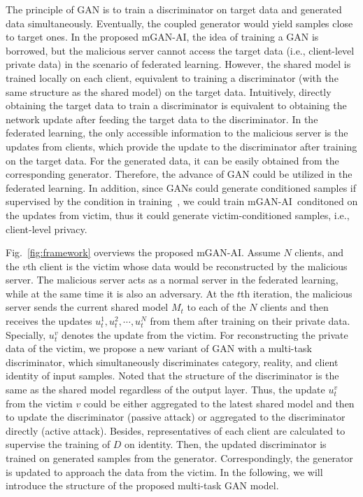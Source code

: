 \documentclass[10pt, conference, letterpaper]{IEEEtran}
\newcommand{\alg}{mGAN-AI}
\begin{document}
The principle of GAN is to train a discriminator on target data and generated data simultaneously. Eventually, the coupled generator would yield samples close to target ones.
In the proposed \alg, the idea of training a GAN is borrowed, but the malicious server cannot access the target data (i.e., client-level private data) in the scenario of federated learning.
However, the shared model is trained locally on each client, equivalent to training a discriminator (with the same structure as the shared model) on the target data. Intuitively, directly obtaining the target data to train a discriminator is equivalent to obtaining the network update after feeding the target data to the discriminator. In the federated learning, the only accessible information to the malicious server is the updates from clients, which provide the update to the discriminator after training on the target data. For the generated data, it can be easily obtained from the corresponding generator. Therefore, the advance of GAN could be utilized in the federated learning. In addition, since GANs could generate conditioned samples if supervised by the condition in training~\cite{chen2016infogan}, we could train \alg~conditoned on the updates from victim, thus it could generate victim-conditioned samples, i.e., client-level privacy.

Fig.~\ref{fig:framework} overviews the proposed \alg. Assume $N$ clients, and the $v$th client is the victim whose data would be reconstructed by the malicious server. The malicious server acts as a normal server in the federated learning, while at the same time it is also an adversary. At the $t$th iteration, the malicious server sends the current shared model $M_t$ to each of the $N$ clients and then receives the updates $u^1_t, u^2_t,\cdots, u^{N}_t$ from them after training on their private data. Specially, $u^v_t$ denotes the update from the victim.
For reconstructing the private data of the victim, we propose a new variant of GAN with a multi-task discriminator, which simultaneously discriminates category, reality, and client identity of input samples. Noted that the structure of the discriminator is the same as the shared model regardless of the output layer.
Thus, the update $u_t^v$ from the victim $v$ could be either aggregated to the latest shared model
and then to update the discriminator
(passive attack) or aggregated to the discriminator directly (active attack).
Besides, representatives of each client are calculated to supervise the training of $D$ on identity.
Then, the updated discriminator is trained on generated samples from the generator. Correspondingly, the generator is updated to approach the data from the victim. In the following, we will introduce the structure of the proposed multi-task GAN model.%
\end{document}
